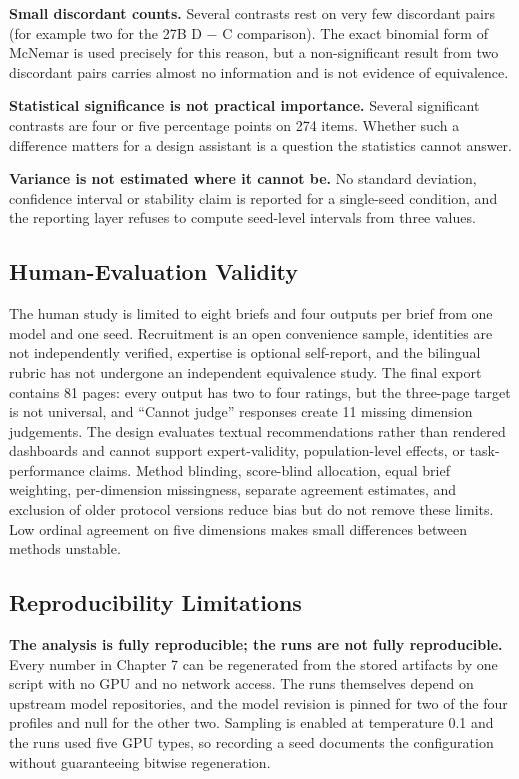 \textbf{Small discordant counts.} Several contrasts rest on very few discordant pairs (for example two for the 27B D \ensuremath{-} C comparison). The exact binomial form of McNemar is used precisely for this reason, but a non-significant result from two discordant pairs carries almost no information and is not evidence of equivalence.

\textbf{Statistical significance is not practical importance.} Several significant contrasts are four or five percentage points on 274 items. Whether such a difference matters for a design assistant is a question the statistics cannot answer.

\textbf{Variance is not estimated where it cannot be.} No standard deviation, confidence interval or stability claim is reported for a single-seed condition, and the reporting layer refuses to compute seed-level intervals from three values.

\subsection{Human-Evaluation Validity}

The human study is limited to eight briefs and four outputs per brief from one model and one seed. Recruitment is an open convenience sample, identities are not independently verified, expertise is optional self-report, and the bilingual rubric has not undergone an independent equivalence study. The final export contains 81 pages: every output has two to four ratings, but the three-page target is not universal, and ``Cannot judge'' responses create 11 missing dimension judgements. The design evaluates textual recommendations rather than rendered dashboards and cannot support expert-validity, population-level effects, or task-performance claims. Method blinding, score-blind allocation, equal brief weighting, per-dimension missingness, separate agreement estimates, and exclusion of older protocol versions reduce bias but do not remove these limits. Low ordinal agreement on five dimensions makes small differences between methods unstable.

\subsection{Reproducibility Limitations}

\textbf{The analysis is fully reproducible; the runs are not fully reproducible.} Every number in Chapter 7 can be regenerated from the stored artifacts by one script with no GPU and no network access. The runs themselves depend on upstream model repositories, and the model revision is pinned for two of the four profiles and null for the other two. Sampling is enabled at temperature 0.1 and the runs used five GPU types, so recording a seed documents the configuration without guaranteeing bitwise regeneration.

